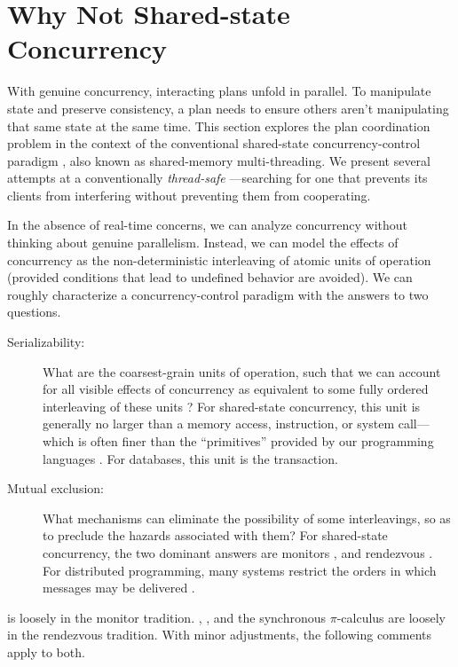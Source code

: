 \documentclass{llncs}
\begin{document}
\section{Why Not Shared-state Concurrency}

With genuine concurrency, interacting plans unfold in parallel. To
manipulate state and preserve consistency, a plan needs to ensure
others aren't manipulating that same state at the same time. This
section explores the plan coordination problem in the context of the
conventional shared-state concurrency-control paradigm
\cite{VanRoyHaridi}, also known as shared-memory multi-threading. We
present several attempts at a conventionally \emph{thread-safe}
---searching for one that prevents its clients from
interfering without preventing them from
cooperating.

In the absence of real-time concerns, we can analyze concurrency
without thinking about genuine parallelism. Instead, we can model the
effects of concurrency as the non-deterministic interleaving of atomic
units of operation (provided conditions that lead to undefined
behavior are avoided). We can roughly characterize a
concurrency-control paradigm with the answers to two questions.
%
\begin{description}

\item[Serializability:] 

What are the coarsest-grain units of operation, such that we can
account for all visible effects of concurrency as equivalent to some
fully ordered interleaving of these units \cite{IBM:POO}? For
shared-state concurrency, this unit is generally no larger than a
memory access, instruction, or system call---which is often finer than
the ``primitives'' provided by our programming languages
\cite{boehm:threads}. For databases, this unit is the transaction.

\item[Mutual exclusion:]

What mechanisms can eliminate the possibility of some interleavings,
so as to preclude the hazards associated with them? For shared-state
concurrency, the two dominant answers are monitors
\cite{hoare:monitors,hansen:monitors}, and rendezvous
\cite{hoare:csp}. For distributed programming, many systems restrict
the orders in which messages may be delivered
\cite{birman:vsync,amir:thesis,lamport:paxos}.

\end{description}
%
 is loosely in the monitor tradition. ,
, and the synchronous $\pi$-calculus are loosely in
the rendezvous tradition. With minor adjustments, the following
comments apply to both.
\end{document}
